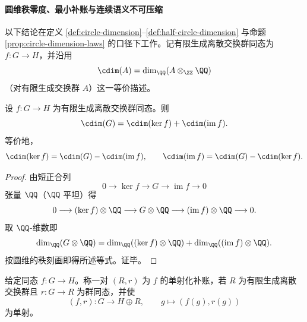 \paragraph{圆维秩零度、最小补账与连续语义不可压缩}
以下结论在定义 \ref{def:circle-dimension}--\ref{def:half-circle-dimension} 与命题 \ref{prop:circle-dimension-laws} 的口径下工作。记有限生成离散交换群同态为 \(f:G\to H\)，并沿用
\[
\cdim(A)=\dim_{\QQ}(A\otimes_{\ZZ}\QQ)
\]
（对有限生成交换群 \(A\)）这一等价描述。

\begin{theorem}[圆维秩零度公式]\label{thm:xi-cdim-rank-nullity}
设 \(f:G\to H\) 为有限生成离散交换群同态。则
\[
\cdim(G)=\cdim(\ker f)+\cdim(\operatorname{im}f).
\]
等价地，
\[
\cdim(\ker f)=\cdim(G)-\cdim(\operatorname{im}f),\qquad
\cdim(\operatorname{im}f)=\cdim(G)-\cdim(\ker f).
\]
\end{theorem}
\begin{proof}
由短正合列
\[
0\longrightarrow \ker f\longrightarrow G\longrightarrow \operatorname{im}f\longrightarrow 0
\]
张量 \(\QQ\)（\(\QQ\) 平坦）得
\[
0\longrightarrow (\ker f)\otimes\QQ\longrightarrow G\otimes\QQ\longrightarrow (\operatorname{im}f)\otimes\QQ\longrightarrow 0.
\]
取 \(\QQ\)-维数即
\[
\dim_{\QQ}(G\otimes\QQ)
=\dim_{\QQ}((\ker f)\otimes\QQ)+\dim_{\QQ}((\operatorname{im}f)\otimes\QQ).
\]
按圆维的秩刻画即得所述等式。证毕。
\end{proof}

\begin{definition}[单射化补账]\label{def:xi-cdim-injective-ledger-completion}
给定同态 \(f:G\to H\)。称一对 \((R,r)\) 为 \(f\) 的单射化补账，若 \(R\) 为有限生成离散交换群且 \(r:G\to R\) 为群同态，并使
\[
(f,r):G\longrightarrow H\oplus R,\qquad g\longmapsto (f(g),r(g))
\]
为单射。
\end{definition}

